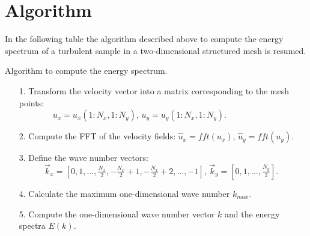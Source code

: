 \section*{Algorithm}
In the following table the algorithm described above to compute the energy spectrum of a turbulent sample in a two-dimensional structured mesh is resumed.
\begin{algorithm}
\label{alg-SRK_solvers}
\caption{Algorithm to compute the energy spectrum.}
\begin{itemize}
\item[1.] Transform the velocity vector into a matrix corresponding to the mesh points:\\
$\quad\quad\quad\quad u_x=u_x(1:N_x,1:N_y)$,  $u_y=u_y(1:N_x,1:N_y)$.\\
\item[2.] Compute the FFT of the velocity fields: $\hat{u}_x=fft(u_x)$, $\hat{u}_y=fft(u_y)$.\\
\item[3.] Define the wave number vectors:\\
$\quad\quad\quad\vec{k}_x=\left[0,1,...,\frac{N_x}{2},-\frac{N_x}{2}+1,-\frac{N_x}{2}+2,...,-1\right]$, $\vec{k}_y=\left[0,1,...,\frac{N_y}{2}\right]$.\\
\item[4.] Calculate the maximum one-dimensional wave number $k_{max}$.\\
\item[5.] Compute the one-dimensional wave number vector $k$ and the energy spectra $E(k)$.\\
\end{itemize}
\end{algorithm}
